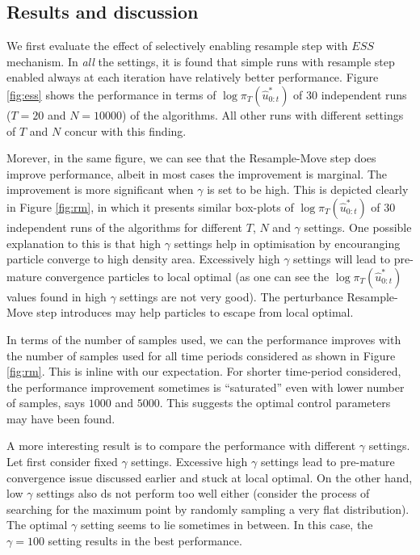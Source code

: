 \subsection{Results and discussion}
We first evaluate the effect of selectively enabling resample step with $ESS$ mechanism. In \emph{all} the settings, it is found that simple runs with resample step enabled always at each iteration have relatively better performance. Figure \ref{fig:ess} shows the performance in terms of $\log\pi_T(\hat{u}^*_{0:t})$ of 30 independent runs ($T=20$ and $N=10000$) of the algorithms. All other runs with different settings of $T$ and $N$ concur with this finding.

Morever, in the same figure, we can see that the Resample-Move step does improve performance, albeit in most cases the improvement is marginal. The improvement is more significant when $\gamma$ is set to be high. This is depicted clearly in Figure \ref{fig:rm}, in which it presents similar box-plots of $\log\pi_T(\hat{u}^*_{0:t})$ of $30$ independent runs of the algorithms for different $T$, $N$ and $\gamma$ settings. One possible explanation to this is that high $\gamma$ settings help in optimisation by encouranging particle converge to high density area. Excessively high $\gamma$ settings will lead to pre-mature convergence particles to local optimal (as one can see the $\log\pi_T(\hat{u}^*_{0:t})$ values found in high $\gamma$ settings are not very good). The perturbance Resample-Move step introduces may help particles to escape from local optimal.

In terms of the number of samples used, we can the performance improves with the number of samples used for all time periods considered as shown in Figure \ref{fig:rm}. This is inline with our expectation. For shorter time-period considered, the performance improvement sometimes is ``saturated'' even with lower number of samples, says $1000$ and $5000$. This suggests the optimal control parameters may have been found.

A more interesting result is to compare the performance with different $\gamma$ settings. Let first consider fixed $\gamma$ settings. Excessive high $\gamma$ settings lead to pre-mature convergence issue discussed earlier and stuck at local optimal. On the other hand, low $\gamma$ settings also ds not perform too well either (consider the process of searching for the maximum point by randomly sampling a very flat distribution). The optimal $\gamma$ setting seems to lie sometimes in between. In this case, the $\gamma=100$ setting results in the best performance.


